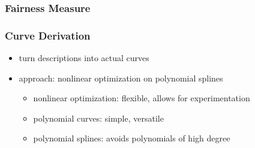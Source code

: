 \documentclass[mathserif]{beamer}
\begin{document}
		\begin{frame}
			\frametitle{Fairness Measure}
		\end{frame}

		\begin{frame}
			\frametitle{Curve Derivation}
			\begin{itemize}
				\item turn descriptions into actual curves
				\item approach: nonlinear optimization on polynomial splines
				\begin{itemize}
					\item nonlinear optimization: flexible, allows for experimentation
					\item polynomial curves: simple, versatile
					\item polynomial splines: avoids polynomials of high degree
				\end{itemize}
			\end{itemize}
		\end{frame}
\end{document}
